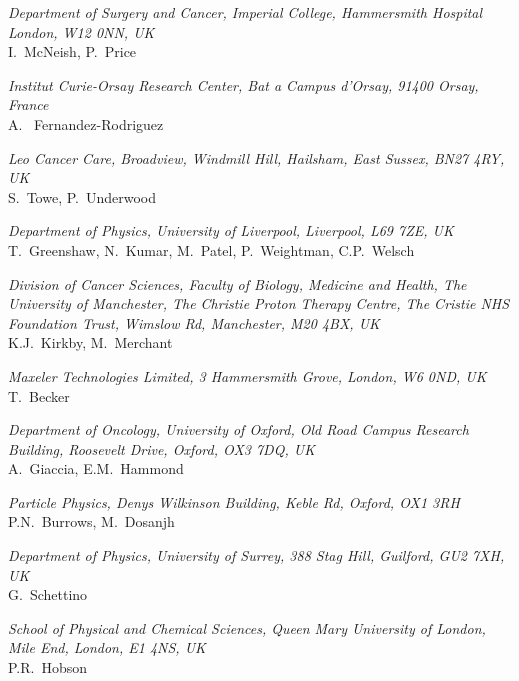 \vspace{0.5cm}
\noindent \textit{Department of Surgery and Cancer, Imperial College, Hammersmith Hospital London, W12 0NN, UK} \\
I.~McNeish, P.~Price
 
\vspace{0.5cm}
\noindent \textit{Institut Curie-Orsay Research Center, Bat a Campus d'Orsay, 91400 Orsay, France} \\
A. ~Fernandez-Rodriguez
 
\vspace{0.5cm}
\noindent \textit{Leo Cancer Care, Broadview, Windmill Hill, Hailsham, East Sussex, BN27 4RY, UK} \\
S.~Towe, P.~Underwood
 
\vspace{0.5cm}
\noindent \textit{Department of Physics, University of Liverpool, Liverpool, L69 7ZE, UK} \\
T.~Greenshaw, N.~Kumar, M.~Patel, P.~Weightman, C.P.~Welsch
 
\vspace{0.5cm}
\noindent \textit{Division of Cancer Sciences, Faculty of Biology, Medicine and Health, The University of Manchester, The Christie Proton Therapy Centre, The Cristie NHS Foundation Trust, Wimslow Rd, Manchester, M20 4BX, UK} \\
K.J.~Kirkby, M.~Merchant
 
\vspace{0.5cm}
\noindent \textit{Maxeler Technologies Limited, 3 Hammersmith Grove, London, W6 0ND, UK} \\
T.~Becker
 
\vspace{0.5cm}
\noindent \textit{Department of Oncology, University of Oxford, Old Road Campus Research Building, Roosevelt Drive, Oxford, OX3 7DQ, UK} \\
A.~Giaccia, E.M.~Hammond
 
\vspace{0.5cm}
\noindent \textit{Particle Physics, Denys Wilkinson Building, Keble Rd, Oxford, OX1 3RH} \\
P.N.~Burrows, M.~Dosanjh
 
\vspace{0.5cm}
\noindent \textit{Department of Physics, University of Surrey, 388 Stag Hill, Guilford, GU2 7XH, UK} \\
G.~Schettino
 
\vspace{0.5cm}
\noindent \textit{School of Physical and Chemical Sciences, Queen Mary University of London, Mile End, London, E1 4NS, UK} \\
P.R.~Hobson
 
